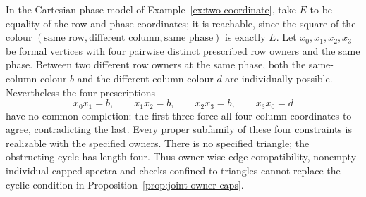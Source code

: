 \begin{example}
\label{ex:joint-cap-four-cycle}
In the Cartesian phase model of Example~\ref{ex:two-coordinate},
take $E$ to be equality of the row and phase coordinates;
it is reachable, since the square of the colour
$(\text{same row},\text{different column},\text{same phase})$
is exactly $E$.  Let $x_0,x_1,x_2,x_3$ be formal vertices with
four pairwise distinct prescribed row owners and the same
phase.  Between two different row owners at the same phase,
both the same-column colour $b$ and the different-column
colour $d$ are individually possible.  Nevertheless the four prescriptions
\[
 x_0x_1=b,\qquad x_1x_2=b,\qquad
 x_2x_3=b,\qquad x_3x_0=d
\]
have no common completion: the first three force all four
column coordinates to agree, contradicting the last.  Every
proper subfamily of these four constraints is realizable with
the specified owners.  There is no specified triangle;
the obstructing cycle has length four.  Thus owner-wise
edge compatibility, nonempty individual capped spectra and
checks confined to triangles cannot replace the cyclic
condition in Proposition~\ref{prop:joint-owner-caps}.
\end{example}

